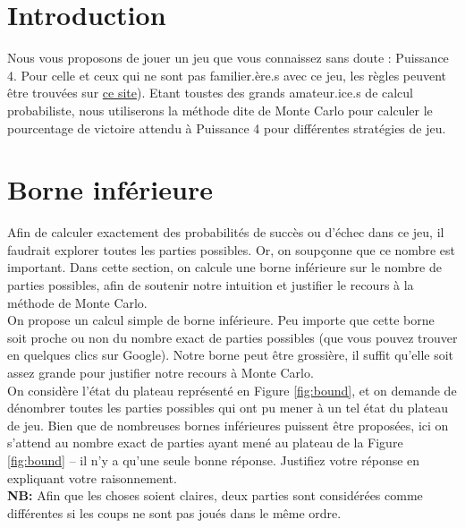 \documentclass[11pt,answers]{exam}
\begin{document}
\section*{Introduction}

Nous vous proposons de jouer un jeu que vous connaissez sans doute : Puissance 4. Pour celle et ceux qui ne sont pas familier.ère.s avec ce jeu, les règles peuvent être trouvées sur \href{https://www.regles-de-jeux.com/regle-du-puissance-4/}{ce site}). Etant toustes des grands amateur.ice.s de calcul probabiliste, nous utiliserons la méthode dite de Monte Carlo pour calculer le pourcentage de victoire attendu à Puissance 4 pour différentes stratégies de jeu.



\bigskip


\section{Borne inférieure} \label{sec:borne_inf}

Afin de calculer exactement des probabilités de succès ou d'échec dans ce jeu, il faudrait explorer toutes les parties possibles. Or, on soupçonne que ce nombre est important. Dans cette section, on calcule une borne inférieure sur le nombre de parties possibles, afin de soutenir notre intuition et justifier le recours à la méthode de Monte Carlo.\\

On propose un calcul simple de borne inférieure. Peu importe que cette borne soit proche ou non du nombre exact de parties possibles (que vous pouvez trouver en quelques clics sur Google). Notre borne peut être grossière, il suffit qu'elle soit assez grande pour justifier notre recours à Monte Carlo.\\

On considère l'état du plateau représenté en Figure \ref{fig:bound}, et on demande de dénombrer toutes les parties possibles qui ont pu mener à un tel état du plateau de jeu. Bien que de nombreuses bornes inférieures puissent être proposées, ici on s'attend au nombre exact de parties ayant mené au plateau de la Figure \ref{fig:bound} -- il n'y a qu'une seule bonne réponse. Justifiez votre réponse en expliquant votre raisonnement.\\

\textbf{NB:} Afin que les choses soient claires, deux parties sont considérées comme différentes si les coups ne sont pas joués dans le même ordre.
\end{document}
